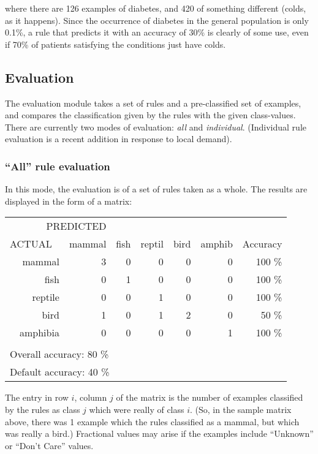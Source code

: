 where there are 126 examples of diabetes, and 420 of something
different (colds, as it happens).  Since the occurrence of
diabetes in the general population is only 0.1\%, a rule
that predicts it with an accuracy of 30\% is clearly of some
use, even if 70\% of patients satisfying the conditions just
have colds.



\subsection{Evaluation}
\label{evaluation}
The evaluation module takes a set of rules and a pre-classified set of 
examples, and compares the classification given by the rules
with the given class-values.  There are currently two modes of
evaluation: {\it all} and {\it individual}.  (Individual rule 
evaluation is a recent addition in response to local demand).

\subsubsection{``All'' rule evaluation}
\label{all_eval}
In this mode, the evaluation is of a set of rules taken as a whole.
The results are displayed in the form of a matrix:

\begin{tabular}{rr|rrrrr|r} 
\multicolumn{3}{r}{PREDICTED} \\
\multicolumn{2}{l|}{ACTUAL} & 
mammal &  fish &  reptil  & bird  &  amphib & Accuracy \\ \cline{2-8}
\raisebox{1.5ex}{\rule{0mm}{1ex}}    
&  mammal &  3 &  0 &  0 &  0 &  0 &   100 \%  \\
  
&    fish &  0 &  1 &  0 &  0 &  0 &   100 \%   \\

& reptile &  0 &  0 &  1 &  0 &  0 &   100 \%  \\

&    bird &  1 &  0 &  1 &  2 &  0 &  50 \%   \\

& amphibia &  0 &  0 &  0 &  0 &  1 &  100 \% \\
\multicolumn{8}{l}{} \\
\multicolumn{8}{l}{Overall accuracy: 80 \%} \\
\multicolumn{8}{l}{Default accuracy: 40 \%}
\end{tabular}

The entry in row $i$, column $j$ of the matrix is the number of
examples classified by the rules  as class $j$ which were really of 
class $i$. (So, in the sample matrix above, 
there was 1 example which the rules classified as a mammal, but
which was really a bird.)  Fractional values may arise if the examples
include ``Unknown'' or ``Don't Care'' values.

